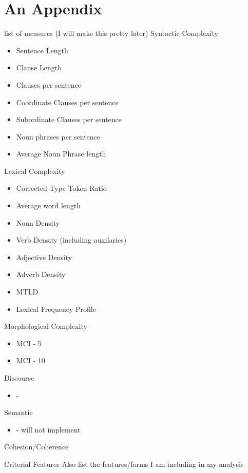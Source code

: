 \chapter{An Appendix}

list of measures (I will make this pretty later)
Syntactic Complexity
\begin{itemize}
    \item Sentence Length
    \item Clause Length
    \item Clauses per sentence
    \item Coordinate Clauses per sentence
    \item Subordinate Clauses per sentence
    \item Noun phrases per sentence
    \item Average Noun Phrase length
\end{itemize}

Lexical Complexity
\begin{itemize}
    \item Corrected Type Token Ratio
    \item Average word length
    \item Noun Density
    \item Verb Density (including auxilaries)
    \item Adjective Density
    \item Adverb Density
    \item MTLD
    \item Lexical Frequency Profile
\end{itemize}

Morphological Complexity
\begin{itemize}
    \item MCI - 5
    \item MCI - 10
\end{itemize}

Discourse
\begin{itemize}
    \item -
\end{itemize}

Semantic
\begin{itemize}
    \item - will not implement
\end{itemize}

Cohesion/Coherence
\begin{itemize}
\end{itemize}


Criterial Features
Also list the features/forms I am including in my analysis